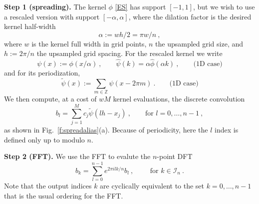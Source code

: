 \documentclass[10pt]{article}
\newcommand{\be}{\begin{equation}}
\newcommand{\ee}{\end{equation}}
\newcommand{\ZZ}{\mathbb{Z}}
\newcommand{\bigO}{{\mathcal O}}
\newcommand{\KK}{{\mathcal I}}     %
\newcommand{\ppsi}{{\tilde\psi}}   %
\newcommand{\al}{\alpha}           %
\begin{document}
{\bf Step 1 (spreading).}
The kernel $\phi$ \eqref{ES} has support $[-1,1]$, but we wish to
use a rescaled version with support $[-\al,\al]$, where
the dilation factor is the desired kernel half-width
\be
\alpha := wh/2 = \pi w/n
~,
\label{al}
\ee
where $w$ is the kernel full width in grid points, $n$
the upsampled grid size, and $h := 2\pi/n$ the upsampled grid spacing.
For the rescaled kernel we write
\be
\psi(x) := \phi(x/\al)~,
\qquad \hat\psi(k) = \al \hat\phi(\al k)~,
\qquad \mbox{(1D case)}
\label{psi1}
\ee
and for its periodization,
\be
\ppsi(x) := \sum_{m\in\ZZ} \psi(x-2\pi m)
~.
\qquad \mbox{(1D case)}
\label{ppsi1}
\ee
We then compute, at a cost of $wM$ kernel evaluations, %
the discrete convolution
\be
b_l = \sum_{j=1}^M c_j \ppsi(lh - x_j)
~, \qquad \mbox{for } l=0,\dots,n-1
~,
\label{bl1}
\ee
as shown in Fig.~\ref{f:spreadalias}(a).
Because of periodicity, here the $l$ index is defined only up to modulo $n$.

{\bf Step 2 (FFT).}
We use the FFT to evalute the $n$-point DFT
\be
\hat{b}_k = \sum_{l=0}^{n-1} e^{2\pi i lk/n} b_l ~, \qquad \mbox{ for } k\in\KK_n
~.
\label{dft1}
\ee
Note that the output indices $k$ are cyclically equivalent to the
set $k=0,\dots,n-1$ that is the usual ordering for the FFT.
\end{document}
